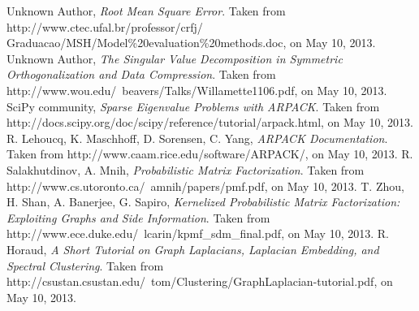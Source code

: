 \documentclass[journal]{IEEEtran}
\begin{document}
%

\vfill
\vfill
\vfill
\begin{thebibliography}{1}
Unknown Author, \emph{Root Mean Square Error}. Taken from http://www.ctec.ufal.br/professor/crfj/\\
Graduacao/MSH/Model\%20evaluation\%20methods.doc, on May 10, 2013.
Unknown Author, \emph{The Singular Value Decomposition in Symmetric Orthogonalization and Data Compression}.
Taken from http://www.wou.edu/~beavers/Talks/Willamette1106.pdf, on May 10, 2013.
SciPy community, \emph{Sparse Eigenvalue Problems with ARPACK}. 
Taken from http://docs.scipy.org/doc/scipy/reference/tutorial/arpack.html, on May 10, 2013.
R. Lehoucq, K. Maschhoff, D. Sorensen, C. Yang, \emph{ARPACK Documentation}. Taken from http://www.caam.rice.edu/software/ARPACK/, on May 10, 2013.
R. Salakhutdinov, A. Mnih, \emph{Probabilistic Matrix Factorization}. Taken from http://www.cs.utoronto.ca/~amnih/papers/pmf.pdf, on May 10, 2013.
T. Zhou, H. Shan, A. Banerjee, G. Sapiro, \emph{Kernelized Probabilistic Matrix Factorization: Exploiting Graphs and Side Information}. 
Taken from http://www.ece.duke.edu/~lcarin/kpmf\_sdm\_final.pdf, on May 10, 2013.
R. Horaud, \emph{A Short Tutorial on Graph Laplacians, Laplacian Embedding, and Spectral Clustering}. Taken from 
http://csustan.csustan.edu/~tom/Clustering/GraphLaplacian-tutorial.pdf, on May 10, 2013.
\end{thebibliography}




\enlargethispage{-5in}
\end{document}
